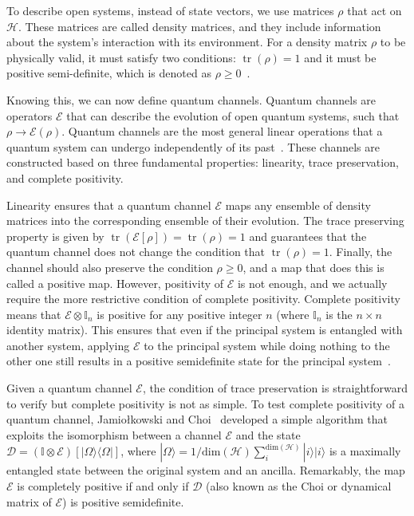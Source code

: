 \documentclass[10pt,letterpaper]{article} %
\DeclareMathOperator{\tr}{tr}
\begin{document}
To describe open systems, instead of state vectors, we use matrices $\rho$ that
act on $\mathcal{H}$.  These matrices are called density matrices, and they
include information about the system's interaction with its environment.  For a
density matrix $\rho$ to be physically valid, it must satisfy two conditions:
$\tr(\rho) = 1$ and it must be positive semi-definite, which is denoted as
$\rho \geq 0$~\cite{chuangbook}.


Knowing this, we can now define quantum channels.  Quantum channels are
operators $\mathcal{E}$ that can describe the evolution of open quantum
systems, such that $\rho \rightarrow \mathcal{E}(\rho)$.  Quantum channels are
the most general linear operations that a quantum system can undergo
independently of its past~\cite{zimansbook,cirac}.  These channels are
constructed based on three fundamental properties: linearity, trace
preservation, and complete positivity.

Linearity ensures that a quantum channel $\mathcal{E}$ maps any ensemble of
density matrices into the corresponding ensemble of their evolution.  The trace
preserving property is given by $\tr (\mathcal{E}[\rho]) = \tr (\rho) = 1$ and
guarantees that the quantum channel does not change the condition that
$\tr(\rho) = 1$.  Finally, the channel should also preserve the condition $\rho
\geq 0$, and a map that does this is called a positive map.  However,
positivity of $\mathcal{E}$ is not enough, and we actually require the more
restrictive condition of complete positivity.  Complete positivity means that
$\mathcal{E} \otimes \mathbb{I}_n$ is positive for any positive integer $n$
(where $\mathbb{I}_n$ is the $n\times n$ identity matrix).  This ensures that
even if the principal system is entangled with another system, applying
$\mathcal{E}$ to the principal system while doing nothing to the other one
still results in  a positive semidefinite state for the principal
system~\cite{chuangbook}. 

Given a quantum channel $\mathcal{E}$, the condition of trace preservation is
straightforward to verify but complete positivity is not as simple.  To test
complete positivity of a quantum channel, Jamiołkowski and
Choi~\cite{choi,jamil} developed a simple algorithm that exploits the
isomorphism between a channel $\mathcal{E}$ and the state $\mathcal{D} =
(\mathbb{I} \otimes \mathcal{E}) [|\Omega \rangle \langle  \Omega|]$, where
$|\Omega\rangle = 1/\text{dim}(\mathcal{H}) \sum_{i}^{\text{dim}(\mathcal{H})}
|i \rangle |i \rangle$ is a maximally entangled state between the original
system and an ancilla.  Remarkably, the map $\mathcal{E}$ is completely
positive if and only if $\mathcal{D}$ (also known as the Choi or dynamical
matrix of $\mathcal{E}$) is positive semidefinite.
\end{document}
